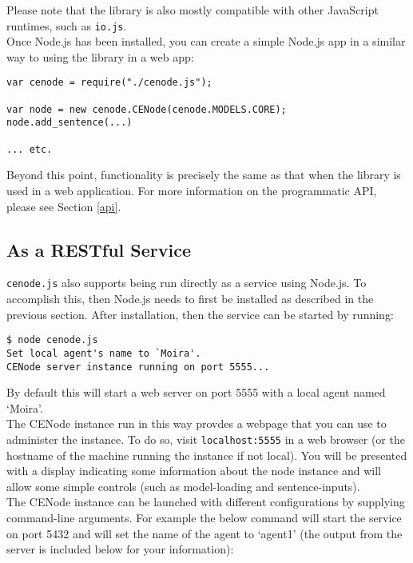\documentclass{scrartcl}
\begin{document}
Please note that the library is also mostly compatible with other JavaScript runtimes, such as \texttt{io.js}.\\

Once Node.js has been installed, you can create a simple Node.js app in a similar way to using the library in a web app:
\begin{verbatim}
var cenode = require("./cenode.js");

var node = new cenode.CENode(cenode.MODELS.CORE);
node.add_sentence(...)

... etc.
\end{verbatim}

Beyond this point, functionality is precisely the same as that when the library is used in a web application. For more information on the programmatic API, please see Section \ref{api}.

\subsection{As a RESTful Service}
\label{as_a_service}
\texttt{cenode.js} also supports being run directly as a service using Node.js. To accomplish this, then Node.js needs to first be installed as described in the previous section. After installation, then the service can be started by running:\\
\begin{verbatim}
$ node cenode.js
Set local agent's name to `Moira'.
CENode server instance running on port 5555...
\end{verbatim}

By default this will start a web server on port 5555 with a local agent named `Moira'.\\

The CENode instance run in this way provdes a webpage that you can use to administer the instance. To do so, visit \texttt{localhost:5555} in a web browser (or the hostname of the machine running the instance if not local). You will be presented with a display indicating some information about the node instance and will allow some simple controls (such as model-loading and sentence-inputs).\\

The CENode instance can be launched with different configurations by supplying command-line arguments. For example the below command will start the service on port 5432 and will set the name of the agent to `agent1' (the output from the server is included below for your information):\\
\end{document}
